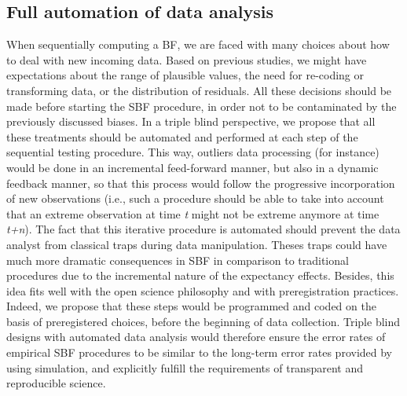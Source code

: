 \documentclass[a4paper,man,natbib,floatsintext,donotrepeattitle]{apa6}
\begin{document}
\subsection{Full automation of data analysis}
When sequentially computing a BF, we are faced with many choices about how to deal with new incoming data. Based on previous studies, we might have expectations about the range of plausible values, the need for re-coding or transforming data, or the distribution of residuals. All these decisions should be made before starting the SBF procedure, in order not to be contaminated by the previously discussed biases. In a triple blind perspective, we propose that all these treatments should be automated and performed at each step of the sequential testing procedure. This way, outliers data processing (for instance) would be done in an incremental feed-forward manner, but also in a dynamic feedback manner, so that this process would follow the progressive incorporation of new observations (i.e., such a procedure should be able to take into account that an extreme observation at time \textit{t} might not be extreme anymore at time \textit{t+n}). The fact that this iterative procedure is automated should prevent the data analyst from classical traps during data manipulation. Theses traps could have much more dramatic consequences in SBF in comparison to traditional procedures due to the incremental  nature of the expectancy effects. Besides, this idea fits well with the open science philosophy and with preregistration practices. Indeed, we propose that these steps would be programmed and coded on the basis of preregistered choices, before the beginning of data collection. Triple blind designs with automated data analysis would therefore ensure the error rates of empirical SBF procedures to be similar to the long-term error rates provided by \cite{schonbrodt_sequential_2017} using simulation, and explicitly fulfill the requirements of transparent and reproducible science. \par

\end{document}
